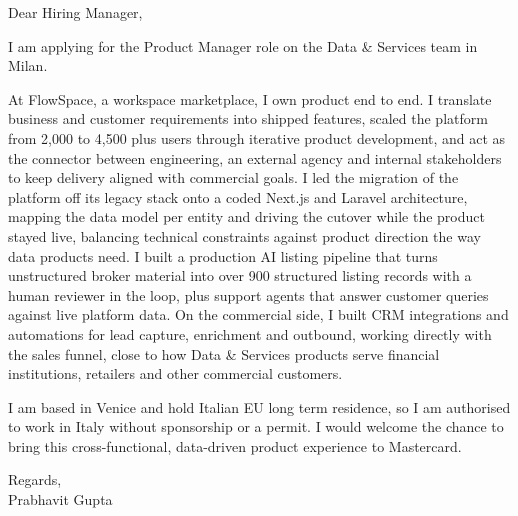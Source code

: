 \documentclass[a4paper,11pt]{article}
\begin{document}
Dear Hiring Manager,

I am applying for the Product Manager role on the Data \& Services team in Milan.

At FlowSpace, a workspace marketplace, I own product end to end. I translate business and customer requirements into shipped features, scaled the platform from 2,000 to 4,500 plus users through iterative product development, and act as the connector between engineering, an external agency and internal stakeholders to keep delivery aligned with commercial goals. I led the migration of the platform off its legacy stack onto a coded Next.js and Laravel architecture, mapping the data model per entity and driving the cutover while the product stayed live, balancing technical constraints against product direction the way data products need. I built a production AI listing pipeline that turns unstructured broker material into over 900 structured listing records with a human reviewer in the loop, plus support agents that answer customer queries against live platform data. On the commercial side, I built CRM integrations and automations for lead capture, enrichment and outbound, working directly with the sales funnel, close to how Data \& Services products serve financial institutions, retailers and other commercial customers.

I am based in Venice and hold Italian EU long term residence, so I am authorised to work in Italy without sponsorship or a permit. I would welcome the chance to bring this cross-functional, data-driven product experience to Mastercard.

Regards,\\
Prabhavit Gupta
\end{document}
